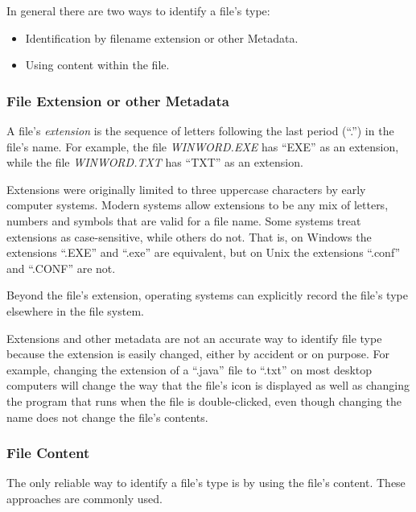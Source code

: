 In general there are two ways to identify a file's type:

\begin{itemize}
\item Identification by filename extension or other Metadata.
\item Using content within the file.
\end{itemize}

\subsubsection{File Extension or other Metadata}

A file's \emph{extension} is the sequence of letters following the
last period (``.'') in the file's name. For example, the file
\emph{WINWORD.EXE} has ``EXE'' as an extension, while the file
\emph{WINWORD.TXT} has ``TXT'' as an extension.

Extensions were originally limited to three uppercase characters by
early computer systems. Modern systems allow extensions to be any mix
of letters, numbers and symbols that are valid for a file name. Some
systems treat extensions as case-sensitive, while others do not. That
is, on Windows the extensions ``.EXE'' and ``.exe'' are equivalent,
but on Unix the extensions ``.conf'' and ``.CONF'' are not.

Beyond the file's extension, operating systems can explicitly record
the file's type elsewhere in the file system.

Extensions and other metadata are not an accurate way to identify file type because
the extension is easily changed, either by accident or on
purpose. For example, changing the extension of a ``.java'' file to
``.txt'' on most desktop computers will change the way that the file's
icon is displayed as well as changing the program that runs when the
file is double-clicked, even though changing the name does not change
the file's contents.

\subsubsection{File Content}

The only reliable way to identify a file's type is by using the file's
content. These approaches are commonly used.

